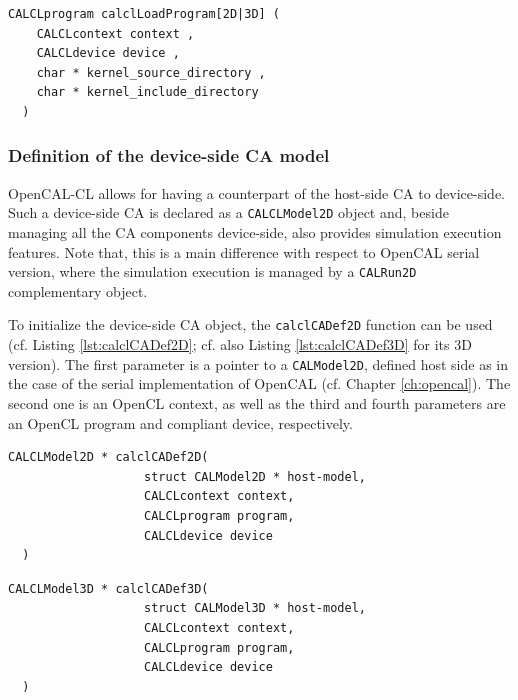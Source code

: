 \begin{lstlisting}[float,floatplacement=H, label=lst:calclLoadProgram, caption={The calclLoadProgram function. It loads and compiles kernels by returning an OpenCL program.}, numbers=none]
  CALCLprogram calclLoadProgram[2D|3D] (
    CALCLcontext context ,
    CALCLdevice device ,
    char * kernel_source_directory ,
    char * kernel_include_directory
  )
\end{lstlisting}

\subsubsection{Definition of the device-side CA model}

OpenCAL-CL allows for having a counterpart of the host-side CA to
device-side. Such a device-side CA is declared as a
\verb'CALCLModel2D' object and, beside managing all the CA components
device-side, also provides simulation execution features. Note
that, this is a main difference with respect to OpenCAL serial
version, where the simulation execution is managed by a
\verb'CALRun2D' complementary object.

To initialize the device-side CA object, the \verb'calclCADef2D'
function can be used (cf. Listing \ref{lst:calclCADef2D}; cf. also
Listing \ref{lst:calclCADef3D} for its 3D version). The first
parameter is a pointer to a \verb'CALModel2D', defined host side as in
the case of the serial implementation of OpenCAL (cf. Chapter
\ref{ch:opencal}). The second one is an OpenCL context, as well as the
third and fourth parameters are an OpenCL program and compliant
device, respectively.


\begin{lstlisting}[float,floatplacement=H, label=lst:calclCADef2D, caption=The calclCADef2D function., numbers=none]
  CALCLModel2D * calclCADef2D(
                   struct CALModel2D * host-model,
                   CALCLcontext context,
                   CALCLprogram program,
                   CALCLdevice device
  )
\end{lstlisting}

\begin{lstlisting}[float,floatplacement=H, label=lst:calclCADef3D, caption=The calclCADef3D function., numbers=none]
  CALCLModel3D * calclCADef3D(
                   struct CALModel3D * host-model,
                   CALCLcontext context,
                   CALCLprogram program,
                   CALCLdevice device
  )
\end{lstlisting}



